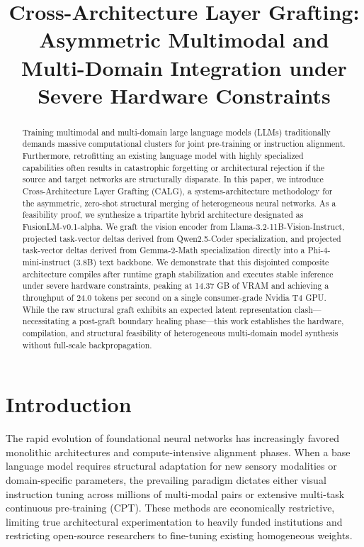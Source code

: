 \documentclass[11pt]{article}
\title{\textbf{Cross-Architecture Layer Grafting: Asymmetric Multimodal and Multi-Domain Integration under Severe Hardware Constraints}}
\author{}
\date{}
\begin{document}
\maketitle

\begin{abstract}
\noindent Training multimodal and multi-domain large language models (LLMs) traditionally demands massive computational clusters for joint pre-training or instruction alignment. Furthermore, retrofitting an existing language model with highly specialized capabilities often results in catastrophic forgetting or architectural rejection if the source and target networks are structurally disparate. In this paper, we introduce Cross-Architecture Layer Grafting (CALG), a systems-architecture methodology for the asymmetric, zero-shot structural merging of heterogeneous neural networks. As a feasibility proof, we synthesize a tripartite hybrid architecture designated as FusionLM-v0.1-alpha. We graft the vision encoder from Llama-3.2-11B-Vision-Instruct, projected task-vector deltas derived from Qwen2.5-Coder specialization, and projected task-vector deltas derived from Gemma-2-Math specialization directly into a Phi-4-mini-instruct (3.8B) text backbone. We demonstrate that this disjointed composite architecture compiles after runtime graph stabilization and executes stable inference under severe hardware constraints, peaking at 14.37 GB of VRAM and achieving a throughput of 24.0 tokens per second on a single consumer-grade Nvidia T4 GPU. While the raw structural graft exhibits an expected latent representation clash—necessitating a post-graft boundary healing phase—this work establishes the hardware, compilation, and structural feasibility of heterogeneous multi-domain model synthesis without full-scale backpropagation.
\end{abstract}

\vspace{0.5cm}

\section{Introduction}
The rapid evolution of foundational neural networks has increasingly favored monolithic architectures and compute-intensive alignment phases. When a base language model requires structural adaptation for new sensory modalities or domain-specific parameters, the prevailing paradigm dictates either visual instruction tuning across millions of multi-modal pairs or extensive multi-task continuous pre-training (CPT). These methods are economically restrictive, limiting true architectural experimentation to heavily funded institutions and restricting open-source researchers to fine-tuning existing homogeneous weights.
\end{document}
